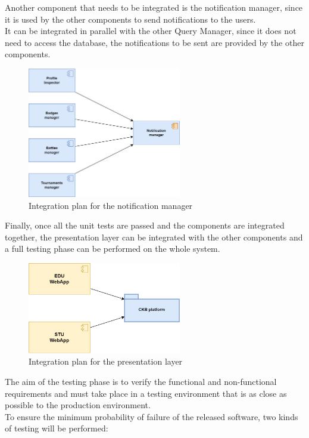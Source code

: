 Another component that needs to be integrated is the notification manager, since it is used by the other components to send notifications to the users.\\
It can be integrated in parallel with the other Query Manager, since it does not need to access the database, the notifications to be sent are provided by the other components.\\

\begin{figure}[H]
    \centering
    \includegraphics[width=0.6\textwidth]{images/test_plan/test-plan-4.png}
    \caption{Integration plan for the notification manager}
    \label{fig:test-plan-4}
\end{figure}

Finally, once all the unit tests are passed and the components are integrated together, the presentation layer can be integrated with the other components and a full testing phase can be performed on the whole system.\\

\begin{figure}[H]
    \centering
    \includegraphics[width=0.6\textwidth]{images/test_plan/test-plan-5.png}
    \caption{Integration plan for the presentation layer}
    \label{fig:test-plan-5}
\end{figure}

The aim of the testing phase is to verify the functional and non-functional requirements and must take place in a testing environment that is as close as possible to the production environment.\\
To ensure the minimum probability of failure of the released software, two kinds of testing will be performed:

